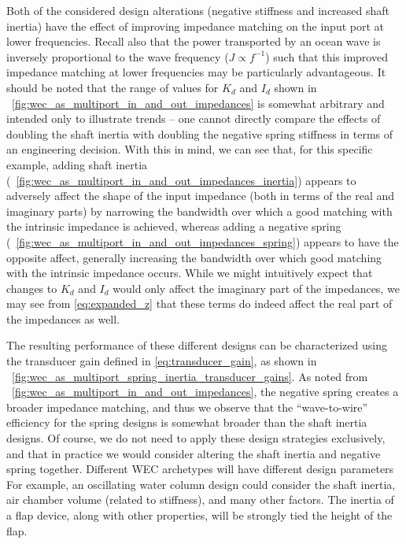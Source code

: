 \documentclass[lettersize,journal]{IEEEtran}
\begin{document}
Both of the considered design alterations (negative stiffness and increased shaft inertia) have the effect of improving impedance matching on the input port at lower frequencies.
Recall also that the power transported by an ocean wave is inversely proportional to the wave frequency ($J \propto f^{-1}$) such that this improved impedance matching at lower frequencies may be particularly advantageous.
It should be noted that the range of values for $K_d$ and $I_d$ shown in \figurename~\ref{fig:wec_as_multiport_in_and_out_impedances} is somewhat arbitrary and intended only to illustrate trends -- one cannot directly compare the effects of doubling the shaft inertia with doubling the negative spring stiffness in terms of an engineering decision.
With this in mind, we can see that, for this specific example, adding shaft inertia (\figurename~\ref{fig:wec_as_multiport_in_and_out_impedances_inertia}) appears to adversely affect the shape of the input impedance (both in terms of the real and imaginary parts) by narrowing the bandwidth over which a good matching with the intrinsic impedance is achieved, whereas adding a negative spring (\figurename~\ref{fig:wec_as_multiport_in_and_out_impedances_spring}) appears to have the opposite affect, generally increasing the bandwidth over which good matching with the intrinsic impedance occurs.
While we might intuitively expect that changes to $K_d$ and $I_d$ would only affect the imaginary part of the impedances, we may see from \eqref{eq:expanded_z} that these terms do indeed affect the real part of the impedances as well.

The resulting performance of these different designs can be characterized using the transducer gain defined in \eqref{eq:transducer_gain}, as shown in \figurename~\ref{fig:wec_as_multiport_spring_inertia_transducer_gains}.
As noted from \figurename~\ref{fig:wec_as_multiport_in_and_out_impedances}, the negative spring creates a broader impedance matching, and thus we observe that the ``wave-to-wire'' efficiency for the spring designs is somewhat broader than the shaft inertia designs.
Of course, we do not need to apply these design strategies exclusively, and that in practice we would consider altering the shaft inertia and negative spring together.
Different WEC archetypes will have different design parameters
For example, an oscillating water column design could consider the shaft inertia, air chamber volume (related to stiffness), and many other factors.
The inertia of a flap device, along with other properties, will be strongly tied the height of the flap.
\end{document}
